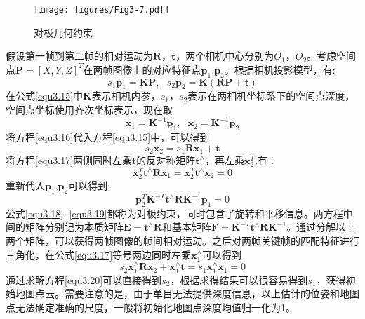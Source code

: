 \begin{figure}[h]
\centering
\texttt{[image: figures/Fig3-7.pdf]}
\caption{对极几何约束}
\label{fig3.7}
\end{figure}
假设第一帧到第二帧的相对运动为$\boldsymbol{R}$，$\boldsymbol{t}$，两个相机中心分别为$O_1$，$O_2$。考虑空间点$\boldsymbol{P}=[X,Y,Z]^T$在两帧图像上的对应特征点$\boldsymbol{p}_1$,$\boldsymbol{p}_2$。根据相机投影模型，有:
\begin{equation}
\label{equ3.15}
s_1 \boldsymbol{p}_1 = \boldsymbol{K} \boldsymbol{P}, \ \ \ 
s_2 \boldsymbol{p}_2 = \boldsymbol{K} (\boldsymbol{R} \boldsymbol{P}+\boldsymbol{t})
\end{equation}
在公式\eqref{equ3.15}中$\boldsymbol{K}$表示相机内参，$s_1$，$s_2$表示在两相机坐标系下的空间点深度，空间点坐标使用齐次坐标表示，现在取
\begin{equation}
\label{equ3.16}
\boldsymbol{x}_1 = \boldsymbol{K}^{-1} \boldsymbol{p}_1, \ \ \ 
\boldsymbol{x}_2 = \boldsymbol{K}^{-1} \boldsymbol{p}_2
\end{equation}
将方程\eqref{equ3.16}代入方程\eqref{equ3.15}中，可以得到
\begin{equation}
\label{equ3.17}
s_2 \boldsymbol{x}_2 = s_1 \boldsymbol{R} \boldsymbol{x}_1 + \boldsymbol{t}
\end{equation}
将方程\eqref{equ3.17}两侧同时左乘$\boldsymbol{t}$的反对称矩阵$\boldsymbol{t}^{\wedge}$，再左乘$\boldsymbol{x}_2^T$,有：
\begin{equation}
\label{equ3.18}
\boldsymbol{x}_2^T  \boldsymbol{t}^{\wedge}  \boldsymbol{R} \boldsymbol{x}_1 = \boldsymbol{x}_2^T \boldsymbol{t}^{\wedge} \boldsymbol{x}_2 = 0
\end{equation}
重新代入$\boldsymbol{p}_1$,$\boldsymbol{p}_2$可以得到:
\begin{equation}
\label{equ3.19}
\boldsymbol{p}_2^T \boldsymbol{K}^{-T} \boldsymbol{t}^{\wedge}  \boldsymbol{R} \boldsymbol{K}^{-1} \boldsymbol{p}_1  = 0
\end{equation}
公式\eqref{equ3.18}, \eqref{equ3.19}都称为对极约束，同时包含了旋转和平移信息。两方程中间的矩阵分别记为本质矩阵$\boldsymbol{E} = \boldsymbol{t}^{\wedge}  \boldsymbol{R} $和基本矩阵$\boldsymbol{F} = \boldsymbol{K}^{-T} \boldsymbol{t}^{\wedge}  \boldsymbol{R} \boldsymbol{K}^{-1}$。通过分解以上两个矩阵，可以获得两帧图像的帧间相对运动。之后对两帧关键帧的匹配特征进行三角化，在公式\eqref{equ3.17}等号两边同时左乘$\boldsymbol{x}_1^{\wedge}$可以得到
\begin{equation}
\label{equ3.20}
s_2 \boldsymbol{x}_1^{\wedge} \boldsymbol{R} \boldsymbol{x}_2 + \boldsymbol{x}_1^{\wedge} \boldsymbol{t} = s_1 \boldsymbol{x}_1^{\wedge} \boldsymbol{x}_1 = 0
\end{equation}
通过求解方程\eqref{equ3.20}可以直接得到$s_2$，根据求得结果可以很容易得到$s_1$，获得初始地图点云。需要注意的是，由于单目无法提供深度信息，以上估计的位姿和地图点无法确定准确的尺度，一般将初始化地图点深度均值归一化为1。

